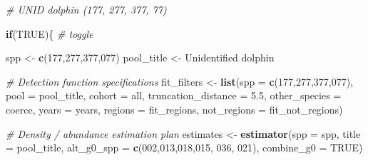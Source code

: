 \documentclass[
]{book}
\newenvironment{Shaded}{\begin{snugshade}}{\end{snugshade}}
\newcommand{\AttributeTok}[1]{\textcolor[rgb]{0.13,0.29,0.53}{#1}}
\newcommand{\CommentTok}[1]{\textcolor[rgb]{0.56,0.35,0.01}{\textit{#1}}}
\newcommand{\ConstantTok}[1]{\textcolor[rgb]{0.56,0.35,0.01}{#1}}
\newcommand{\ControlFlowTok}[1]{\textcolor[rgb]{0.13,0.29,0.53}{\textbf{#1}}}
\newcommand{\FloatTok}[1]{\textcolor[rgb]{0.00,0.00,0.81}{#1}}
\newcommand{\FunctionTok}[1]{\textcolor[rgb]{0.13,0.29,0.53}{\textbf{#1}}}
\newcommand{\NormalTok}[1]{#1}
\newcommand{\OtherTok}[1]{\textcolor[rgb]{0.56,0.35,0.01}{#1}}
\newcommand{\StringTok}[1]{\textcolor[rgb]{0.31,0.60,0.02}{#1}}
\begin{document}
\begin{Shaded}
\begin{Highlighting}[]
\CommentTok{\# UNID dolphin (177, 277, 377, 77)}

\ControlFlowTok{if}\NormalTok{(}\ConstantTok{TRUE}\NormalTok{)\{ }\CommentTok{\# toggle}

\NormalTok{  spp }\OtherTok{\textless{}{-}} \FunctionTok{c}\NormalTok{(}\StringTok{\textquotesingle{}177\textquotesingle{}}\NormalTok{,}\StringTok{\textquotesingle{}277\textquotesingle{}}\NormalTok{,}\StringTok{\textquotesingle{}377\textquotesingle{}}\NormalTok{,}\StringTok{\textquotesingle{}077\textquotesingle{}}\NormalTok{)}
\NormalTok{  pool\_title }\OtherTok{\textless{}{-}} \StringTok{\textquotesingle{}Unidentified dolphin\textquotesingle{}}

  \CommentTok{\# Detection function specifications}
\NormalTok{  fit\_filters }\OtherTok{\textless{}{-}}
    \FunctionTok{list}\NormalTok{(}\AttributeTok{spp =} \FunctionTok{c}\NormalTok{(}\StringTok{\textquotesingle{}177\textquotesingle{}}\NormalTok{,}\StringTok{\textquotesingle{}277\textquotesingle{}}\NormalTok{,}\StringTok{\textquotesingle{}377\textquotesingle{}}\NormalTok{,}\StringTok{\textquotesingle{}077\textquotesingle{}}\NormalTok{),}
         \AttributeTok{pool =}\NormalTok{ pool\_title,}
         \AttributeTok{cohort =} \StringTok{\textquotesingle{}all\textquotesingle{}}\NormalTok{,}
         \AttributeTok{truncation\_distance =} \FloatTok{5.5}\NormalTok{,}
         \AttributeTok{other\_species =} \StringTok{\textquotesingle{}coerce\textquotesingle{}}\NormalTok{,}
         \AttributeTok{years =}\NormalTok{ years,}
         \AttributeTok{regions =}\NormalTok{ fit\_regions,}
         \AttributeTok{not\_regions =}\NormalTok{ fit\_not\_regions)}

  \CommentTok{\# Density / abundance estimation plan}
\NormalTok{  estimates }\OtherTok{\textless{}{-}} \FunctionTok{estimator}\NormalTok{(}\AttributeTok{spp =}\NormalTok{ spp, }
                         \AttributeTok{title =}\NormalTok{ pool\_title,}
                         \AttributeTok{alt\_g0\_spp =} \FunctionTok{c}\NormalTok{(}\StringTok{\textquotesingle{}002\textquotesingle{}}\NormalTok{,}\StringTok{\textquotesingle{}013\textquotesingle{}}\NormalTok{,}\StringTok{\textquotesingle{}018\textquotesingle{}}\NormalTok{,}\StringTok{\textquotesingle{}015\textquotesingle{}}\NormalTok{, }\StringTok{\textquotesingle{}036\textquotesingle{}}\NormalTok{, }\StringTok{\textquotesingle{}021\textquotesingle{}}\NormalTok{),}
                         \AttributeTok{combine\_g0 =} \ConstantTok{TRUE}\NormalTok{)}
  

\end{Highlighting}
\end{Shaded}
\end{document}
